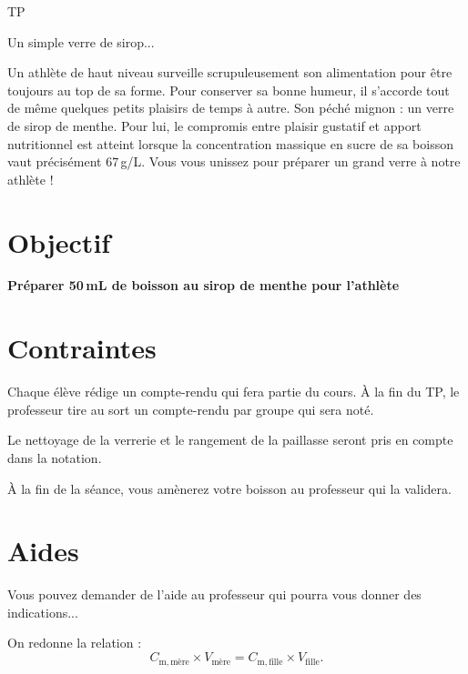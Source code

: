 




\begin{header}
TP

Un simple verre de sirop...
\end{header}

Un athlète de haut niveau surveille scrupuleusement son alimentation pour être toujours au top de sa forme.
Pour conserver sa bonne humeur, il s'accorde tout de même quelques petits plaisirs de temps à autre.
Son péché mignon : un verre de sirop de menthe.
Pour lui, le compromis entre plaisir gustatif et apport nutritionnel est atteint lorsque la concentration massique en sucre de sa boisson vaut précisément 67\,g/L.
Vous vous unissez pour préparer un grand verre à notre athlète !

\section*{Objectif}

\begin{objectif}
\textbf{Préparer 50\,mL de boisson au sirop de menthe pour l'athlète}
\end{objectif}

\section*{Contraintes}

Chaque élève rédige un compte-rendu qui fera partie du cours.
À la fin du TP, le professeur tire au sort un compte-rendu par groupe qui sera noté.

Le nettoyage de la verrerie et le rangement de la paillasse seront pris en compte dans la notation.

À la fin de la séance, vous amènerez votre boisson au professeur qui la validera.

\section*{Aides}

Vous pouvez demander de l'aide au professeur qui pourra vous donner des indications...

On redonne la relation :
\begin{equation}
C_\mathrm{m,mère} \times V_\mathrm{mère} = C_\mathrm{m,fille} \times V_\mathrm{fille}.
\nonumber
\end{equation}

